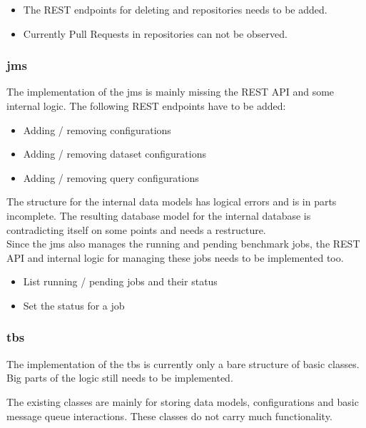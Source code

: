 \begin{itemize}
	\item The REST endpoints for deleting \gh{} and \dockh{} repositories needs to be added.
	
	\item Currently Pull Requests in \gh{} repositories can not be observed.
\end{itemize}


\subsubsection{\acl{jms}}
The implementation of the \acl{jms} is mainly missing the REST API and some internal logic.
The following REST endpoints have to be added:

\begin{itemize}
	\item Adding / removing \ts{} configurations
	
	\item Adding / removing dataset configurations
	
	\item Adding / removing query configurations
\end{itemize}

The structure for the internal data models has logical errors and is in parts incomplete.
The resulting database model for the internal database is contradicting itself on some points and needs a restructure.
\\

Since the \ac{jms} also manages the running and pending benchmark jobs, the REST API and internal logic for managing these jobs needs to be implemented too.

\begin{itemize}
	\item List running / pending jobs and their status
	
	\item Set the status for a job
\end{itemize}



\subsubsection{\acl{tbs}}
The implementation of the \acl{tbs} is currently only a bare structure of basic classes.
Big parts of the logic still needs to be implemented.

The existing classes are mainly for storing data models, configurations and basic message queue interactions.
These classes do not carry much functionality.

